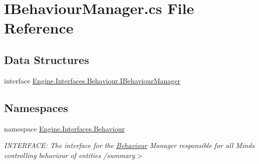 \hypertarget{a00095}{}\section{I\+Behaviour\+Manager.\+cs File Reference}
\label{a00095}
\subsection*{Data Structures}
\begin{DoxyCompactItemize}
\item 
interface \hyperlink{a00418}{Engine.\+Interfaces.\+Behaviour.\+I\+Behaviour\+Manager}
\end{DoxyCompactItemize}
\subsection*{Namespaces}
\begin{DoxyCompactItemize}
\item 
namespace \hyperlink{a00252}{Engine.\+Interfaces.\+Behaviour}
\begin{DoxyCompactList}\small\item\em I\+N\+T\+E\+R\+F\+A\+CE\+: The interface for the \hyperlink{a00252}{Behaviour} Manager responsible for all Mind\textquotesingle{}s controlling behaviour of entities /summary$>$ \end{DoxyCompactList}\end{DoxyCompactItemize}
